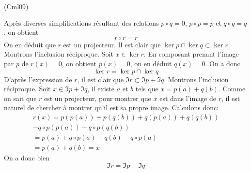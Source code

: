 \begin{tiny}(Cml09)\end{tiny} Après diverses simplifications résultant des relations $p\circ q =0$, $p\circ p=p$ et $q\circ q=q$, on obtient
\begin{displaymath}
 r\circ r = r
\end{displaymath}
On en déduit que $r$ est un projecteur. Il est clair que $\ker p \cap \ker q\subset \ker r$. Montrons l'inclusion réciproque.\newline
Soit $x\in \ker r$. En composant prenant l'image par $p$ de $r(x)=0$, on obtient $p(x)=0$, on en déduit $q(x)=0$. On a donc
\begin{displaymath}
 \ker r = \ker p \cap \ker q
\end{displaymath}
D'après l'expression de $r$, il est clair que $\Im r\subset \Im p + \Im q$. Montrons l'inclusion réciproque.\newline
Soit $x\in \Im p + \Im q$, il existe $a$ et $b$ tels que $x=p(a)+q(b)$. Comme on sait que $r$ est un projecteur, pour montrer que $x$ est dans l'image de $r$, il est naturel de chercher à montrer qu'il est sa propre image. Calculons donc:
\begin{multline*}
 r(x) = p(p(a))+p(q(b))+q(p(a))+q(q(b))\\-q\circ p(p(a))-q\circ p(q(b))\\
= p(a) +q\circ p(a) +q(b)-q\circ p(a)\\ = p(a)+q(b)=x
\end{multline*}
On a donc bien
\begin{displaymath}
 \Im r = \Im p + \Im q
\end{displaymath}

